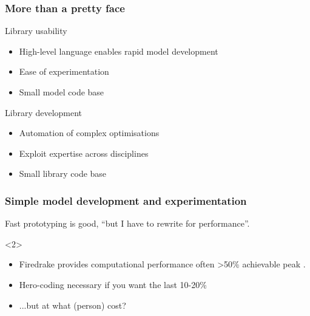 \documentclass[presentation]{beamer}
\begin{document}
\begin{frame}
  \frametitle{More than a pretty face}

  \begin{block}{Library usability}
    \begin{itemize}
    \item High-level language enables rapid model development
    \item Ease of experimentation
    \item Small model code base
    \end{itemize}
  \end{block}

  \begin{block}{Library development}
    \begin{itemize}
    \item Automation of complex optimisations
    \item Exploit expertise across disciplines
    \item Small library code base
    \end{itemize}
  \end{block}
\end{frame}

\begin{frame}
  \frametitle{Simple model development and experimentation}
  Fast prototyping is good, ``but I have to rewrite for performance''.

  \begin{uncoverenv}<2>
    \begin{itemize}
    \item Firedrake provides computational performance often >50\%
      achievable peak \parencite{Luporini:2015,Luporini:2016,Bercea:2016}.
    \item Hero-coding necessary if you want the last 10-20\%
    \item ...but at what (person) cost?
    \end{itemize}
  \end{uncoverenv}
\end{frame}
\end{document}
